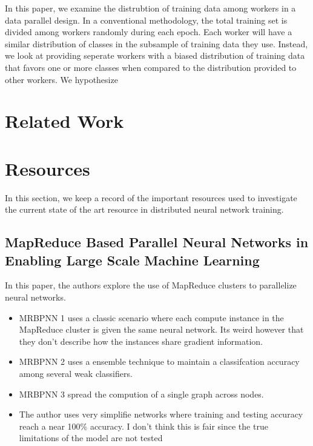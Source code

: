 \documentclass{article}
\begin{document}
In this paper, we examine the distrubtion of training data among workers in a data parallel design. In a conventional methodology, the total training set is divided among workers randomly during each epoch. Each worker will have a similar distribution of classes in the subsample of training data they use. Instead, we look at providing seperate workers with a biased distribution of training data that favors one or more classes when compared to the distribution provided to other workers. We hypothesize 

\section{Related Work}




\section{Resources}

In this section, we keep a record of the important resources used to investigate the current state of the art resource in distributed neural network training.

\subsection{MapReduce Based Parallel Neural Networks in Enabling Large Scale Machine Learning}

In this paper, the authors explore the use of MapReduce clusters to parallelize neural networks.

\begin{itemize}

    \item MRBPNN 1 uses a classic scenario where each compute instance in the MapReduce cluster is given the same neural network. Its weird however that they don't describe how the instances share gradient information.

    \item MRBPNN 2 uses a ensemble technique to maintain a classifcation accuracy among several weak classifiers.
    
    \item MRBPNN 3 spread the compution of a single graph across nodes. 
    
    \item The author uses very simplifie networks where training and testing accuracy reach a near 100\% accuracy. I don't think this is fair since the true limitations of the model are not tested
    
\end{itemize}
\end{document}
